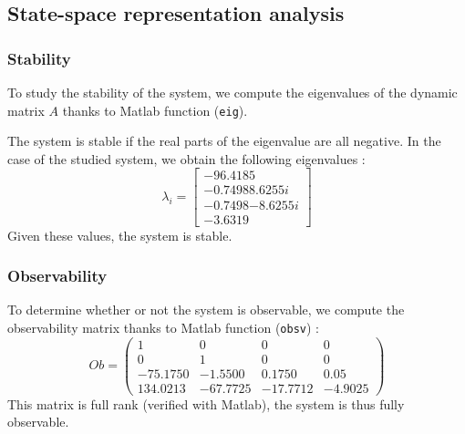 \documentclass[a4paper, 12pt]{article}
\begin{document}
    \subsection{State-space representation analysis}
    
    \subsubsection{Stability}
    To study the stability of the system, we compute the eigenvalues of the dynamic matrix $A$ thanks to Matlab function (\texttt{eig}).\par
    The system is stable if the real parts of the eigenvalue are all negative. In the case of the studied system, we obtain the following eigenvalues :
    \begin{equation*}
        \lambda_i = \begin{bmatrix}
            \num{-96.4185}\\\num{-0.7498+8.6255i}\\\num{-0.7498-8.6255i}\\\num{-3.6319}
        \end{bmatrix}
    \end{equation*}
    Given these values, the system is stable.
    
    \subsubsection{Observability}
    To determine whether or not the system is observable, we compute the observability matrix thanks to Matlab function (\texttt{obsv}) :
    \begin{equation*}
        Ob = \begin{pmatrix}
            1 & 0 & 0 & 0\\
            0 & 1 & 0 & 0\\
            \num{-75.1750} & \num{-1.5500} & \num{0.1750} & \num{0.05}\\
            \num{134.0213} & \num{-67.7725} & \num{-17.7712} & \num{-4.9025}
        \end{pmatrix}
    \end{equation*}
    This matrix is full rank (verified with Matlab), the system is thus fully observable.
    
\end{document}
